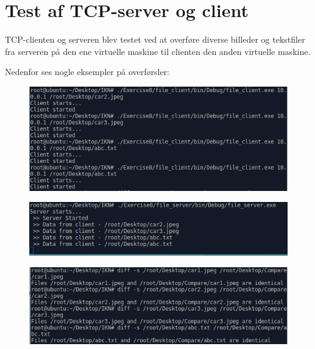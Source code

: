 \chapter{Test af TCP-server og client}\label{ch:test}
TCP-clienten og serveren blev testet ved at overføre diverse billeder og tekstfiler fra serveren på den ene virtuelle maskine til clienten den anden virtuelle maskine.

Nedenfor ses nogle eksempler på overførsler:

		\begin{figure}[H]
			\centering
			\includegraphics[width=160mm]{figures/Clientstart.png}
		\end{figure}

		\begin{figure}[H]
			\centering
			\includegraphics[width=160mm]{figures/Serverstart.png}
		\end{figure}
		
		\begin{figure}[H]
			\centering
			\includegraphics[width=160mm]{figures/compare.png}
		\end{figure}


